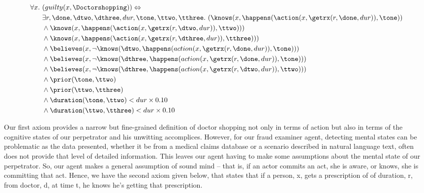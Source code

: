 \begin{footnotesize}
\begin{align*}
[A1'] \ \forall x . \ &(guilty(x, \Doctorshopping)) \Leftrightarrow \\
	& \exists r, \done, \dtwo, \dthree, dur, \tone, \ttwo, \tthree . \ (\knows(x,\happens(\action(x, \getrx(r, \done, dur)), \tone)) \\
	& \wedge \knows(x,\happens(\action(x,\getrx(r,\dtwo,dur)),\ttwo))) \\
	& \wedge \knows(x,\happens(\action(x,\getrx(r,\dthree,dur)),\tthree))) \\
	& \wedge \believes(x,\neg\knows(\dtwo,\happens(action(x,\getrx(r,\done,dur)),\tone))) \\
	& \wedge \believes(x,\neg\knows(\dthree,\happens(action(x,\getrx(r,\done,dur)),\tone))) \\
	& \wedge \believes(x,\neg\knows(\dthree,\happens(action(x,\getrx(r,\dtwo,dur)),\ttwo))) \\
	& \wedge \prior(\tone, \ttwo) \\
	& \wedge \prior(\ttwo, \tthree) \\
	& \wedge \duration(\tone, \ttwo) < dur \times 0.10 \\
	& \wedge \duration(\ttwo, \tthree) < dur \times 0.10
\end{align*}
\end{footnotesize}


Our first axiom provides a narrow but fine-grained definition of doctor shopping not only in terms of action but also in terms of the cognitive states of our perpetrator and his unwitting accomplices.  However, for our fraud examiner agent, detecting mental states can be problematic as the data presented, whether it be from a medical claims database or a scenario described in natural language text, often does not provide that level of detailed information.  This leaves our agent having to make some assumptions about the mental state of our perpetrator.  So, our agent makes a general assumption of sound mind -- that is, if an actor commits an act, she is aware, or knows, she is committing that act.  Hence, we have the second axiom given below, that states that if a person, x, gets a prescription of of duration, r, from doctor, d, at time t, he knows he's getting that prescription.



